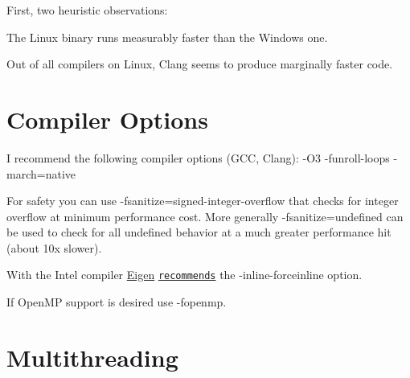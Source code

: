 First, two heuristic observations\+:


\begin{DoxyItemize}
\item The Linux binary runs measurably faster than the Windows one.
\item Out of all compilers on Linux, Clang seems to produce marginally faster code.
\end{DoxyItemize}\hypertarget{perf_compoptions}{}\section{Compiler Options}\label{perf_compoptions}

\begin{DoxyItemize}
\item I recommend the following compiler options (G\+CC, Clang)\+: {\ttfamily -\/\+O3 -\/funroll-\/loops -\/march=native }
\item For safety you can use -\/fsanitize=signed-\/integer-\/overflow that checks for integer overflow at minimum performance cost. More generally -\/fsanitize=undefined can be used to check for all undefined behavior at a much greater performance hit (about 10x slower).
\item With the Intel compiler \hyperlink{namespaceEigen}{Eigen} \href{ http://eigen.tuxfamily.org/index.php?title=Main_Page#Compiler_support}{\tt recommends} the {\ttfamily -\/inline-\/forceinline} option.
\item If Open\+MP support is desired use {\ttfamily -\/fopenmp}.
\end{DoxyItemize}\hypertarget{perf_thread}{}\section{Multithreading}\label{perf_thread}

